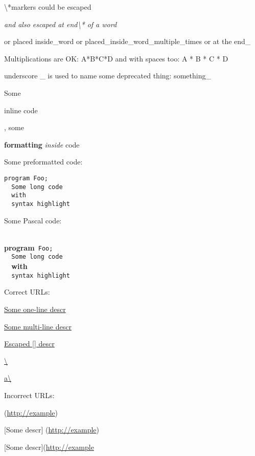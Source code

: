\documentclass{report}
\begin{document}
{\textbackslash}*markers could be escaped

\textit{and also escaped at end{\textbackslash}* of a word}

or placed inside{\_}word or placed{\_}inside{\_}word{\_}multiple{\_}times or at the end{\_}

Multiplications are OK: A*B*C*D and with spaces too: A * B * C * D

underscore {\_} is used to name some deprecated thing: something{\_}

Some \begin{ttfamily}inline code\end{ttfamily}, some \begin{ttfamily}\textbf{formatting} \textit{inside} code\end{ttfamily}

Some preformatted code:

\begin{verbatim}
program Foo;
  Some long code
  with
  syntax highlight\end{verbatim}

Some Pascal code:

\texttt{\\\nopagebreak[3]
}\textbf{program}\texttt{~Foo;\\\nopagebreak[3]
~~Some~long~code\\\nopagebreak[3]
~~}\textbf{with}\texttt{\\\nopagebreak[3]
~~syntax~highlight\\
}

Correct URLs:

\href{http://example}{Some one-line descr}

\href{http://example}{Some multi-line
   descr}

\href{http://example}{Escaped [] descr}

\href{http://example}{{\textbackslash}}

\href{http://example}{a{\textbackslash}}

Incorrect URLs:

(\href{http://example}{http://example})

[Some descr] (\href{http://example}{http://example})

[Some descr](\href{http://example}{http://example}
\end{document}
